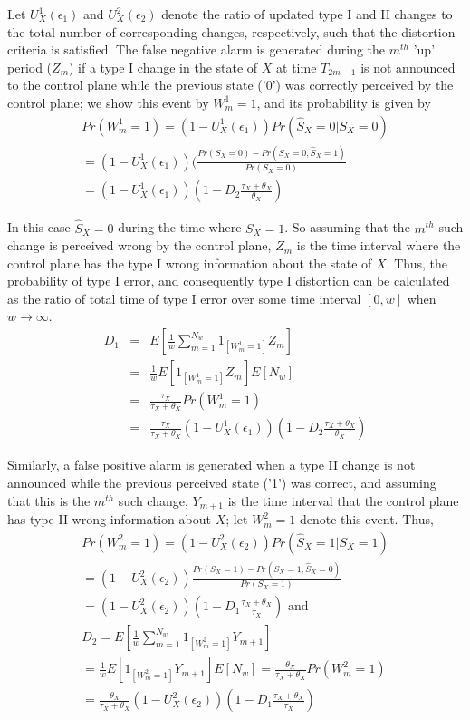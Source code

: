 \documentclass[conference]{IEEEtran}
\theoremstyle{plain}
\theoremstyle{remark}
\begin{document}
Let $U^{1}_X(\epsilon_1)$ and  $U^{2}_X(\epsilon_2)$ denote the ratio of updated type I and II changes to the total number of corresponding changes, respectively, such that the distortion criteria is satisfied. The false negative alarm is generated during the $m^{th}$ 'up' period ($Z_m$) if a type I change in the state of $X$ at time $T_{2m-1}$ is not announced to the control plane while the previous state ('0') was correctly perceived by the control plane; we show this event by $W^1_m=1$, and its probability is given by
\begin{eqnarray}
&Pr(W^1_m=1) = (1-U^1_X(\epsilon_1))Pr(\hat{S}_X=0|S_X=0)& \nonumber \\
&= (1-U^1_X(\epsilon_1))(\frac{Pr(S_X=0)-Pr(S_X=0,\hat{S}_X=1)}{Pr(S_X=0)}& \nonumber \\
&= (1-U^1_X(\epsilon_1))(1-D_2\frac{\tau_X+\theta_X}{\theta_X})&
\end{eqnarray}

In this case $\hat{S}_X=0$ during the time where $S_X=1$. So assuming that the $m^{th}$ such change is perceived wrong by the control plane, $Z_m$ is the time interval where the control plane has the type I wrong information about the state of $X$. Thus, the probability of type I error, and consequently type I distortion can be calculated as the ratio of total time of type I error over some time interval $[0,w]$ when $w\rightarrow \infty$.
\begin{eqnarray}
   D_1&=&E[\frac{1}{w}\sum_{m=1}^{N_w}1_{[W^1_m=1]}Z_m] \nonumber \\
	&=& \frac{1}{w}E[1_{[W^1_m=1]}Z_m]E[N_w] \nonumber \\
	&=&\frac{\tau_X}{\tau_X+\theta_X}Pr(W^1_m=1) \nonumber \\
	&=&\frac{\tau_X}{\tau_X+\theta_X}(1-U^1_X(\epsilon_1))(1-D_2\frac{\tau_X+\theta_X}{\theta_X})
\end{eqnarray}

Similarly, a false positive alarm is generated when a type II change is not announced while the previous perceived state ('1') was correct, and assuming that this is the $m^{th}$ such change, $Y_{m+1}$ is the time interval that the control plane has type II wrong information about $X$; let $W^2_m=1$ denote this event. Thus,
\begin{eqnarray}
&Pr(W^2_m=1) = (1-U^2_X(\epsilon_2))Pr(\hat{S}_X=1|S_X=1)& \nonumber \\
&= (1-U^2_X(\epsilon_2))\frac{Pr(S_X=1)-Pr(S_X=1,\hat{S}_X=0)}{Pr(S_X=1)} &\nonumber\\
&= (1-U^2_X(\epsilon_2))(1-D_1\frac{\tau_X+\theta_X}{\tau_X})\mbox{    and}& \nonumber\\
   &D_2=E[\frac{1}{w}\sum_{m=1}^{N_w}1_{[W^2_m=1]}Y_{m+1}] & \nonumber \\
	&= \frac{1}{w}E[1_{[W^2_m=1]}Y_{m+1}]E[N_w]=\frac{\theta_X}{\tau_X+\theta_X}Pr(W^2_m=1)& \nonumber \\
	&=\frac{\theta_X}{\tau_X+\theta_X}(1-U^2_X(\epsilon_2))(1-D_1\frac{\tau_X+\theta_X}{\tau_X})&\nonumber
\end{eqnarray}
\end{document}
